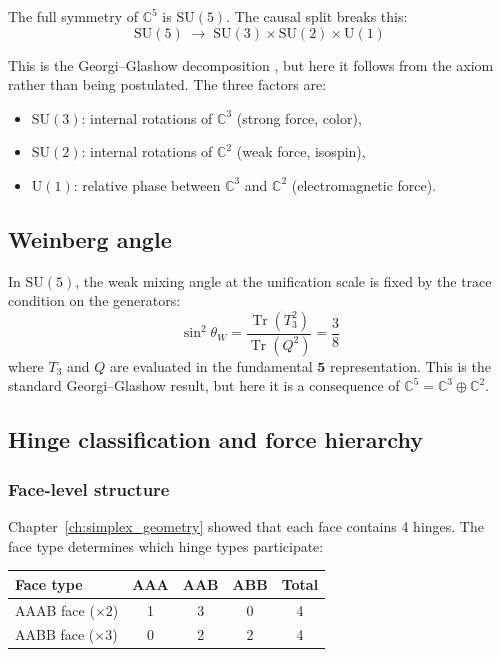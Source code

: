\documentclass[12pt]{article}
\theoremstyle{remark}
\theoremstyle{definition}
\newcommand{\CC}{\mathbb{C}}
\newcommand{\tr}{\operatorname{Tr}}
\begin{document}
The full symmetry of $\CC^5$ is $\text{SU}(5)$. The causal split breaks this:
\begin{equation}
\text{SU}(5) \;\to\; \text{SU}(3) \times \text{SU}(2) \times \text{U}(1)
\end{equation}

This is the Georgi--Glashow decomposition \cite{GeorgiGlashow}, but here it follows from the axiom rather than being postulated. The three factors are:
\begin{itemize}
\item $\text{SU}(3)$: internal rotations of $\CC^3$ (strong force, color),
\item $\text{SU}(2)$: internal rotations of $\CC^2$ (weak force, isospin),
\item $\text{U}(1)$: relative phase between $\CC^3$ and $\CC^2$ (electromagnetic force).
\end{itemize}

\subsection{Weinberg angle}

In $\text{SU}(5)$, the weak mixing angle at the unification scale is fixed by the trace condition on the generators:
\begin{equation}
\sin^2\theta_W = \frac{\tr(T_3^2)}{\tr(Q^2)} = \frac{3}{8}
\end{equation}
where $T_3$ and $Q$ are evaluated in the fundamental $\mathbf{5}$ representation. This is the standard Georgi--Glashow result, but here it is a consequence of $\CC^5 = \CC^3 \oplus \CC^2$.

\subsection{Hinge classification and force hierarchy}

\subsubsection{Face-level structure}

Chapter~\ref{ch:simplex_geometry} showed that each face contains 4 hinges. The face type determines which hinge types participate:

\begin{center}
\begin{tabular}{lcccc}
\hline
Face type & AAA & AAB & ABB & Total \\
\hline
AAAB face ($\times 2$) & 1 & 3 & 0 & 4 \\
AABB face ($\times 3$) & 0 & 2 & 2 & 4 \\
\hline
\end{tabular}
\end{center}
\end{document}
